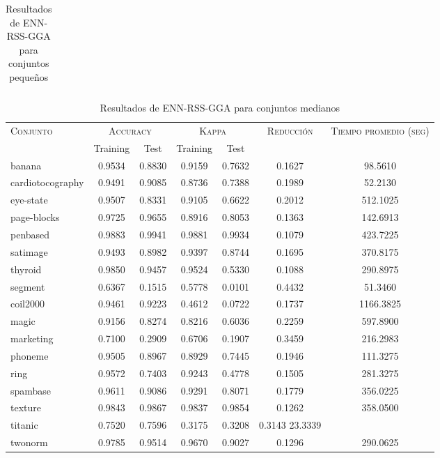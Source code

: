 \begin{table}[]
\begin{tabular}{l c c c c c c}
\hline
\end{tabular}
\caption{Resultados de ENN-RSS-GGA para conjuntos pequeños }
\label{res-peq-enn-rss-gga}
\end{table}



\begin{table}[]
\centering
\begin{tabular}{l c c c c c c}
\hline
\multirow{2}{*}{\textsc{Conjunto}}
	& \multicolumn{2}{c}{\textsc{Accuracy}}
	& \multicolumn{2}{c}{\textsc{Kappa}}
	& \textsc{Reducción}
	& \textsc{Tiempo promedio (seg)} \\
	& Training & Test
	& Training & Test \\ 
\hline
\hline

banana & 0.9534 & 0.8830 & 0.9159 & 0.7632 & 0.1627 & 98.5610 \\
cardiotocography & 0.9491 & 0.9085 & 0.8736 & 0.7388 & 0.1989 & 52.2130 \\
eye-state & 0.9507 & 0.8331 & 0.9105 & 0.6622 & 0.2012 &  512.1025 \\
page-blocks & 0.9725 & 0.9655 & 0.8916 & 0.8053 & 0.1363 & 142.6913 \\
penbased & 0.9883 & 0.9941 & 0.9881 & 0.9934 & 0.1079 &  423.7225 \\
satimage & 0.9493 & 0.8982 & 0.9397 & 0.8744 & 0.1695 &  370.8175 \\
thyroid & 0.9850 & 0.9457 & 0.9524 & 0.5330 & 0.1088 &  290.8975 \\
segment & 0.6367 & 0.1515 & 0.5778 & 0.0101 & 0.4432 & 51.3460 \\
coil2000 & 0.9461 & 0.9223 & 0.4612 & 0.0722 & 0.1737 &  1166.3825 \\
magic & 0.9156 & 0.8274 & 0.8216 & 0.6036 & 0.2259 &  597.8900 \\
marketing & 0.7100 & 0.2909 & 0.6706 & 0.1907 & 0.3459 & 216.2983 \\
phoneme & 0.9505 & 0.8967 & 0.8929 & 0.7445 & 0.1946 & 111.3275 \\
ring & 0.9572 & 0.7403 & 0.9243 & 0.4778 & 0.1505 &  281.3275 \\
spambase & 0.9611 & 0.9086 & 0.9291 & 0.8071 & 0.1779 &  356.0225 \\
texture & 0.9843 & 0.9867 & 0.9837 & 0.9854 & 0.1262 &  358.0500 \\
titanic & 0.7520 & 0.7596 & 0.3175 & 0.3208 & 0.3143  23.3339 \\
twonorm & 0.9785 & 0.9514 & 0.9670 & 0.9027 & 0.1296 &  290.0625 \\

\hline
\end{tabular}
\caption{Resultados de ENN-RSS-GGA para conjuntos medianos }
\label{res-med-enn-rss-gga}
\end{table}



